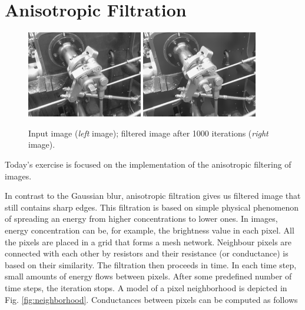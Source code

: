 \documentclass[12pt]{article}
\begin{document}
\section*{Anisotropic Filtration}

\begin{figure}[ht]
    \centering
    \includegraphics[width=0.45\textwidth]{input_image.png}
    \includegraphics[width=0.45\textwidth]{anisotropic_filter_image.png}
    \caption{Input image (\textit{left} image); filtered image after 1000 iterations (\textit{right} image).}
\end{figure}

\noindent
Today's exercise is focused on the implementation of the anisotropic filtering of images.

\noindent
In contrast to the Gaussian blur, anisotropic filtration gives us filtered image that
still contains sharp edges. This filtration is based on simple physical phenomenon of
spreading an energy from higher concentrations to lower ones. In images, energy concentration
can be, for example, the brightness value in each pixel. All the pixels are placed in a grid
that forms a mesh network. Neighbour pixels are connected with each other by resistors
and their resistance (or conductance) is based on their similarity. The filtration then proceeds
in time. In each time step, small amounts of energy flows between pixels. After some predefined
number of time steps, the iteration stops.
\newline
\newline
\noindent
A model of a pixel neighborhood is depicted in Fig. \ref{fig:neighborhood}.
Conductances between pixels can be computed as follows
\end{document}
